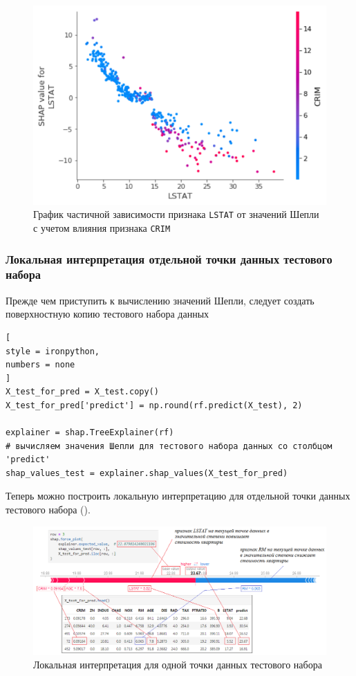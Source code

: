 \documentclass[%
	11pt,
	a4paper,
	utf8,
		]{article}
\begin{document}
\begin{figure}[h]
	\centering
	\includegraphics[scale=0.85]{figures/shap_dependence_plt_train.png}
	\caption{ График частичной зависимости признака \texttt{LSTAT} от значений Шепли\\с учетом влияния признака \texttt{CRIM} }\label{fig:shap_dependence_plt_train}
\end{figure}

\subsubsection{Локальная интерпретация отдельной точки данных тестового набора}

Прежде чем приступить к вычислению значений Шепли, следует создать поверхностную копию тестового набора данных

\begin{lstlisting}[
style = ironpython,
numbers = none
]
X_test_for_pred = X_test.copy()
X_test_for_pred['predict'] = np.round(rf.predict(X_test), 2)

explainer = shap.TreeExplainer(rf)
# вычисляем значения Шепли для тестового набора данных со столбцом 'predict'
shap_values_test = explainer.shap_values(X_test_for_pred)
\end{lstlisting}

Теперь можно построить локальную интерпретацию для отдельной точки данных тестового набора ().

\begin{figure}
	\centering
	\includegraphics[scale=0.7]{figures/shap_dependence_plt_test.png}
	\caption{ Локальная интерпретация для одной точки данных тестового набора }\label{fig:shap_dependence_plt_test}
\end{figure}
\end{document}
